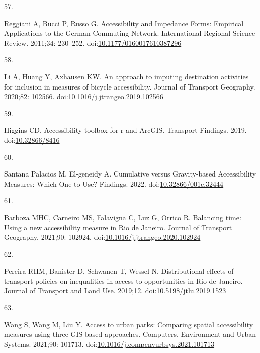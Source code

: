 \documentclass[10pt,letterpaper]{article}
\newlength{\cslhangindent}
\newlength{\csllabelwidth}
\newlength{\cslentryspacingunit} %
\newenvironment{CSLReferences}[2] %
 {%
  \setlength{\parindent}{0pt}
  \ifodd #1
  \let\oldpar\par
  \def\par{\hangindent=\cslhangindent\oldpar}
  \fi
  \setlength{\parskip}{#2\cslentryspacingunit}
 }%
 {}
\newcommand{\CSLLeftMargin}[1]{\parbox[t]{\csllabelwidth}{#1}}
\newcommand{\CSLRightInline}[1]{\parbox[t]{\linewidth - \csllabelwidth}{#1}\break}
\begin{document}
\begin{CSLReferences}{0}{0}
\leavevmode{}%
\CSLLeftMargin{57. }%
\CSLRightInline{Reggiani A, Bucci P, Russo G. Accessibility and
{Impedance} {Forms}: {Empirical} {Applications} to the {German}
{Commuting} {Network}. International Regional Science Review. 2011;34:
230--252.
doi:\href{https://doi.org/10.1177/0160017610387296}{10.1177/0160017610387296}}

\leavevmode{}%
\CSLLeftMargin{58. }%
\CSLRightInline{Li A, Huang Y, Axhausen KW. An approach to imputing
destination activities for inclusion in measures of bicycle
accessibility. Journal of Transport Geography. 2020;82: 102566.
doi:\href{https://doi.org/10.1016/j.jtrangeo.2019.102566}{10.1016/j.jtrangeo.2019.102566}}

\leavevmode{}%
\CSLLeftMargin{59. }%
\CSLRightInline{Higgins CD. Accessibility toolbox for r and ArcGIS.
Transport Findings. 2019.
doi:\href{https://doi.org/10.32866/8416}{10.32866/8416}}

\leavevmode{}%
\CSLLeftMargin{60. }%
\CSLRightInline{Santana Palacios M, El-geneidy A. Cumulative versus
Gravity-based Accessibility Measures: Which One to Use? Findings. 2022.
doi:\href{https://doi.org/10.32866/001c.32444}{10.32866/001c.32444}}

\leavevmode{}%
\CSLLeftMargin{61. }%
\CSLRightInline{Barboza MHC, Carneiro MS, Falavigna C, Luz G, Orrico R.
Balancing time: {Using} a new accessibility measure in {Rio} de
{Janeiro}. Journal of Transport Geography. 2021;90: 102924.
doi:\href{https://doi.org/10.1016/j.jtrangeo.2020.102924}{10.1016/j.jtrangeo.2020.102924}}

\leavevmode{}%
\CSLLeftMargin{62. }%
\CSLRightInline{Pereira RHM, Banister D, Schwanen T, Wessel N.
Distributional effects of transport policies on inequalities in access
to opportunities in {Rio} de {Janeiro}. Journal of Transport and Land
Use. 2019;12.
doi:\href{https://doi.org/10.5198/jtlu.2019.1523}{10.5198/jtlu.2019.1523}}

\leavevmode{}%
\CSLLeftMargin{63. }%
\CSLRightInline{Wang S, Wang M, Liu Y. Access to urban parks:
{Comparing} spatial accessibility measures using three {GIS}-based
approaches. Computers, Environment and Urban Systems. 2021;90: 101713.
doi:\href{https://doi.org/10.1016/j.compenvurbsys.2021.101713}{10.1016/j.compenvurbsys.2021.101713}}


\end{CSLReferences}
\end{document}
